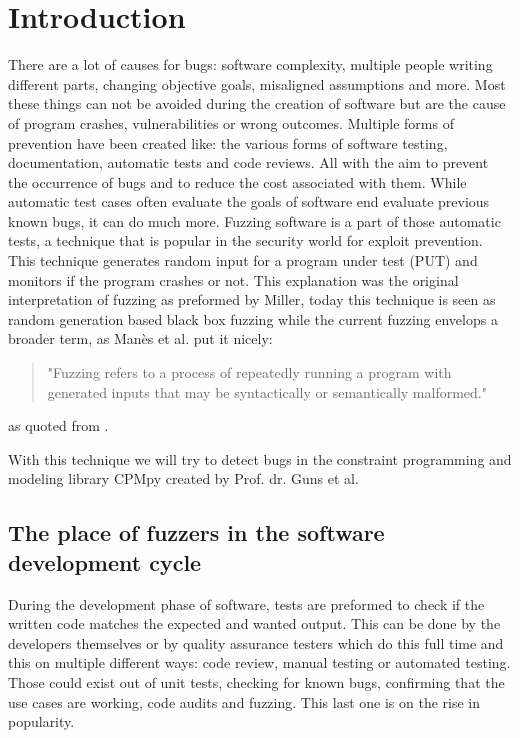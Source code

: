 \chapter{Introduction}
\label{cha:intro}
There are a lot of causes for bugs: software complexity, multiple people writing different parts, changing objective goals, misaligned assumptions and more. Most these things can not be avoided during the creation of software but are the cause of program crashes, vulnerabilities or wrong outcomes. Multiple forms of prevention have been created like: the various forms of software testing, documentation, automatic tests and code reviews. All with the aim to prevent the occurrence of bugs and to reduce the cost associated with them. While automatic test cases often evaluate the goals of software end evaluate previous known bugs, it can do much more. Fuzzing software is a part of those automatic tests, a technique that is popular in the security world for exploit prevention. This technique generates random input for a program under test (PUT) and monitors if the program crashes or not. This explanation was the original interpretation of fuzzing as preformed by Miller\cite{4originalFuzzingUnixUtils}, today this technique is seen as random  generation based black box fuzzing while the current fuzzing envelops a broader term, as Man\`es et al.\cite{13manes2019survey} put it nicely:
\begin{quote}
"Fuzzing refers to a process of repeatedly running a program with generated inputs that may be syntactically or semantically malformed."
\end{quote} as quoted from \cite{13manes2019survey}.

With this technique we will try to detect bugs in the constraint programming and modeling library CPMpy \cite{17guns2019increasing} created by Prof. dr. Guns et al.


\section{The place of fuzzers in the software development cycle}
During the development phase of software, tests are preformed to check if the written code matches the expected and wanted output. This can be done by the developers themselves or by quality assurance testers which do this full time and this on multiple different ways: code review, manual testing or automated testing. Those could exist out of unit tests, checking for known bugs, confirming that the use cases are working, code audits and fuzzing. This last one is on the rise in popularity.



